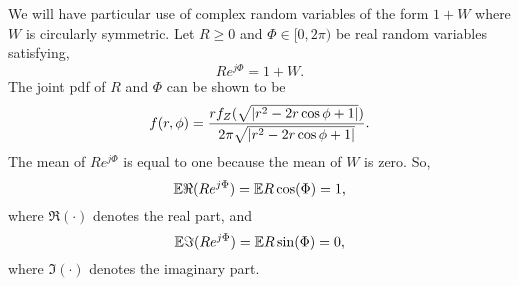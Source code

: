\documentclass[journal]{IEEEtran}
\begin{document}
We will have particular use of complex random variables of the form $1 + W$ where $W$ is circularly symmetric.  Let $R \geq 0$ and $\Phi \in [0,2\pi)$ be real random variables satisfying, 
\[
R e^{j\Phi} = 1 + W.
\]
The joint pdf of $R$ and $\Phi$ can be shown to be
\begin{equation}\label{eq:pdfRPhi}
f(r,\phi) = \frac{r f_Z(\sqrt{{\left\vert r^2 - 2r\cos\phi + 1 \right\vert}})}{2\pi\sqrt{{\left\vert r^2 - 2r\cos\phi + 1 \right\vert}}}.
\end{equation}
The mean of $R e^{j\Phi}$ is equal to one because the mean of $W$ is zero.  So,
\begin{equation}\label{eq:expectRepartRphi}
{\mathbb E} \Re(R e^{j\Phi}) = {\mathbb E} R \cos(\Phi) = 1,
\end{equation}
where $\Re(\cdot)$ denotes the real part, and
\begin{equation}\label{eq:expectImpartRphi}
{\mathbb E} \Im(R e^{j\Phi}) = {\mathbb E} R \sin(\Phi) = 0,
\end{equation}
where $\Im(\cdot)$ denotes the imaginary part.


\end{document}
